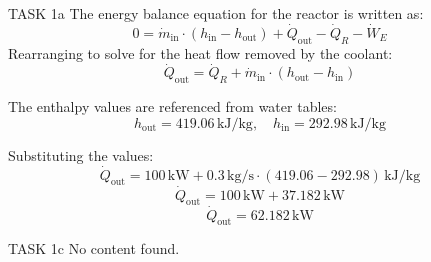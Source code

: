 TASK 1a  
The energy balance equation for the reactor is written as:  
\[
0 = \dot{m}_{\text{in}} \cdot (h_{\text{in}} - h_{\text{out}}) + \dot{Q}_{\text{out}} - \dot{Q}_R - \dot{W}_E
\]  
Rearranging to solve for the heat flow removed by the coolant:  
\[
\dot{Q}_{\text{out}} = \dot{Q}_R + \dot{m}_{\text{in}} \cdot (h_{\text{out}} - h_{\text{in}})
\]  

The enthalpy values are referenced from water tables:  
\[
h_{\text{out}} = 419.06 \, \text{kJ/kg}, \quad h_{\text{in}} = 292.98 \, \text{kJ/kg}
\]  

Substituting the values:  
\[
\dot{Q}_{\text{out}} = 100 \, \text{kW} + 0.3 \, \text{kg/s} \cdot (419.06 - 292.98) \, \text{kJ/kg}
\]  
\[
\dot{Q}_{\text{out}} = 100 \, \text{kW} + 37.182 \, \text{kW}
\]  
\[
\dot{Q}_{\text{out}} = 62.182 \, \text{kW}
\]  

TASK 1c  
No content found.